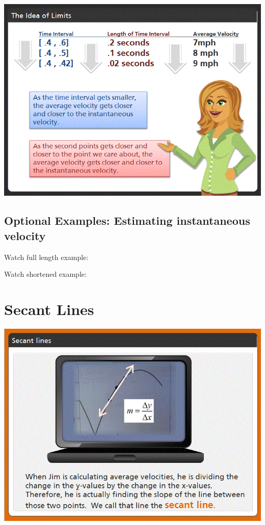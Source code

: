 \documentclass{ximera}
\begin{document}
\begin{image}
\includegraphics{picture3.gif}
\end{image}


\subsection{Optional Examples: Estimating instantaneous velocity}

Watch full length example:
\begin{foldable}
\end{foldable}

Watch shortened example: 
\begin{foldable}
\end{foldable}


\section{Secant Lines}

\begin{image}
\includegraphics{picture4.gif}
\end{image}
\end{document}
